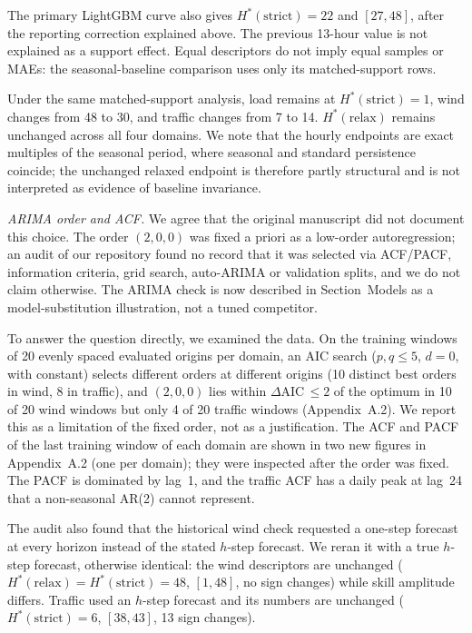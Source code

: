 \documentclass[11pt,a4paper]{article}
\begin{document}
The primary LightGBM curve also gives $H^*(\mathrm{strict})=22$ and
$[27,48]$, after the reporting correction explained above. The previous
13-hour value is not explained as a support effect. Equal descriptors
do not imply equal samples or MAEs: the seasonal-baseline comparison
uses only its matched-support rows.

Under the same matched-support analysis, load remains at
$H^*(\mathrm{strict})=1$, wind changes from 48 to 30, and traffic changes from
7 to 14. $H^*(\mathrm{relax})$ remains unchanged across all four domains. We
note that the hourly endpoints are exact multiples of the seasonal period,
where seasonal and standard persistence coincide; the unchanged relaxed
endpoint is therefore partly structural and is not interpreted as evidence of
baseline invariance.

\textit{ARIMA order and ACF.} We agree that the original manuscript did not document this choice. The order
$(2,0,0)$ was fixed a priori as a low-order autoregression; an audit of our
repository found no record that it was selected via ACF/PACF, information
criteria, grid search, auto-ARIMA or validation splits, and we do not claim
otherwise. The ARIMA check is now described in Section~Models as a
model-substitution illustration, not a tuned competitor.

To answer the question directly, we examined the data. On the training windows
of 20 evenly spaced evaluated origins per domain, an AIC search
($p,q\le5$, $d=0$, with constant) selects different orders at different origins
(10 distinct best orders in wind, 8 in traffic), and $(2,0,0)$ lies within
$\Delta$AIC$\,\le 2$ of the optimum in 10 of 20 wind windows but only 4 of 20
traffic windows (Appendix~A.2). We report this as a limitation of the fixed
order, not as a justification. The ACF and PACF of the last training window of each domain
are shown in two new figures in Appendix~A.2 (one per domain); they were inspected after the order was fixed. The PACF is dominated by lag~1,
and the traffic ACF has a daily peak at lag~24 that a non-seasonal AR(2) cannot represent.

The audit also found that the historical wind check requested a one-step
forecast at every horizon instead of the stated $h$-step forecast. We reran it
with a true $h$-step forecast, otherwise identical: the wind descriptors are
unchanged ($H^*(\mathrm{relax})=H^*(\mathrm{strict})=48$, $[1,48]$, no sign
changes) while skill amplitude differs. Traffic used an $h$-step forecast and its
numbers are unchanged ($H^*(\mathrm{strict})=6$, $[38,43]$, 13 sign changes).
\end{document}
